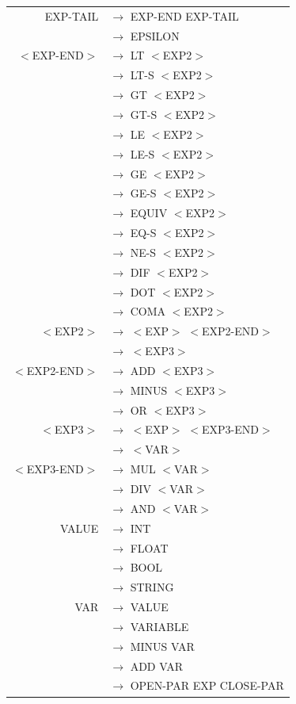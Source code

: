 \documentclass[a4paper,10pt]{article}
\begin{document}
\begin{tabular}{rl}
EXP-TAIL			& $\rightarrow$ EXP-END EXP-TAIL \\
					& $\rightarrow$ EPSILON \\
					
					
$<$EXP-END$>$		& $\rightarrow$ LT $<$EXP2$>$\\
					& $\rightarrow$ LT-S $<$EXP2$>$\\
					& $\rightarrow$ GT $<$EXP2$>$\\
					& $\rightarrow$ GT-S $<$EXP2$>$\\
					& $\rightarrow$ LE $<$EXP2$>$\\
					& $\rightarrow$ LE-S $<$EXP2$>$\\
					& $\rightarrow$ GE $<$EXP2$>$\\
					& $\rightarrow$ GE-S $<$EXP2$>$\\
					& $\rightarrow$ EQUIV $<$EXP2$>$\\
					& $\rightarrow$ EQ-S $<$EXP2$>$\\
					& $\rightarrow$ NE-S $<$EXP2$>$\\
					& $\rightarrow$ DIF $<$EXP2$>$\\
					& $\rightarrow$ DOT $<$EXP2$>$\\
					& $\rightarrow$ COMA $<$EXP2$>$\\
										
					
$<$EXP2$>$			& $\rightarrow$ $<$EXP$>$ $<$EXP2-END$>$\\
					& $\rightarrow$ $<$EXP3$>$\\
					
$<$EXP2-END$>$		& $\rightarrow$  ADD $<$EXP3$>$\\
					& $\rightarrow$  MINUS $<$EXP3$>$\\
					& $\rightarrow$  OR $<$EXP3$>$\\					

					
$<$EXP3$>$			& $\rightarrow$ $<$EXP$>$ $<$EXP3-END$>$\\
					& $\rightarrow$ $<$VAR$>$\\
					
$<$EXP3-END$>$		& $\rightarrow$ MUL $<$VAR$>$\\
					& $\rightarrow$ DIV $<$VAR$>$\\
					& $\rightarrow$ AND $<$VAR$>$\\

VALUE				& $\rightarrow$ INT \\
					& $\rightarrow$ FLOAT \\
					& $\rightarrow$ BOOL \\
					& $\rightarrow$ STRING \\
					
VAR					& $\rightarrow$ VALUE \\
					& $\rightarrow$ VARIABLE \\
					& $\rightarrow$ MINUS VAR\\
					& $\rightarrow$ ADD VAR \\
					& $\rightarrow$ OPEN-PAR EXP CLOSE-PAR \\

\end{tabular}
\end{document}
